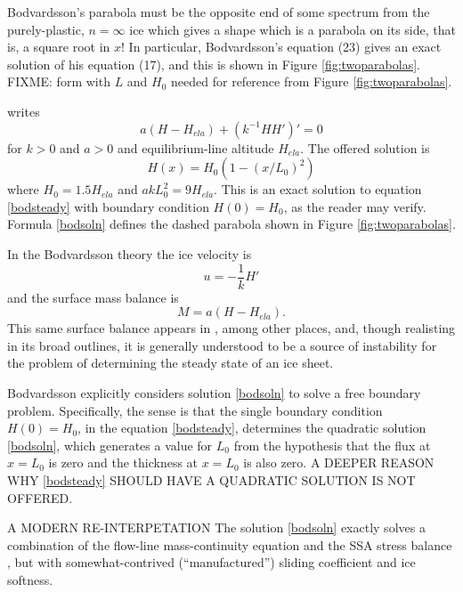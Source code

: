 \documentclass[twocolumn,letterpaper]{igs}
\begin{document}
Bodvardsson's parabola must be the opposite end of some spectrum from the
purely-plastic, $n=\infty$ ice which gives a shape which is a parabola
on its side, that is, a square root in $x$!  In particular, Bodvardsson's equation (23) gives an exact solution of his equation (17), and this is shown in Figure \ref{fig:twoparabolas}.  FIXME: form with $L$ and $H_0$ needed for reference from Figure \ref{fig:twoparabolas}.

\citet[equation (17)]{Bodvardsson} writes 
\begin{equation}
a (H - H_{ela}) + (k^{-1} H H')' = 0  \label{bodsteady}
\end{equation}
for $k>0$ and $a>0$ and equilibrium-line altitude $H_{ela}$.  The offered solution \citep[equation (23)]{Bodvardsson} is
\begin{equation}
H(x) = H_0 (1 - (x/L_0)^2)  \label{bodsoln}
\end{equation}
where $H_0 = 1.5 H_{ela}$ and $a k L_0^2 = 9 H_{ela}$.  This is an exact solution to equation \eqref{bodsteady} with boundary condition $H(0)=H_0$, as the reader may verify.  Formula \eqref{bodsoln} defines the dashed parabola shown in Figure \ref{fig:twoparabolas}.

In the Bodvardsson theory the ice velocity is
\begin{equation}
u = - \frac{1}{k} H' \label{bodstressbalance}
\end{equation}
and the surface mass balance is
\begin{equation}
M = a (H - H_{ela}).  \label{bodmassbalance}
\end{equation}
This same surface balance appears in \cite{Weertman61stability,Jouvetetal2011}, among other places, and, though realisting in its broad outlines, it is generally understood to be a source of instability for the problem of determining the steady state of an ice sheet.

Bodvardsson explicitly considers solution \eqref{bodsoln} to solve a free boundary problem.  Specifically, the sense is that the single boundary condition $H(0)=H_0$, in the equation \eqref{bodsteady}, determines the quadratic solution \eqref{bodsoln}, which generates a value for $L_0$ from the hypothesis that the flux at $x=L_0$ is zero and the thickness at $x=L_0$ is also zero.  A DEEPER REASON WHY \eqref{bodsteady} SHOULD HAVE A QUADRATIC SOLUTION IS NOT OFFERED.

A MODERN RE-INTERPETATION  The solution \eqref{bodsoln} exactly solves a combination of the flow-line mass-continuity equation and the SSA stress balance \citep{MacAyeal,WeisGreveHutter}, but with somewhat-contrived (``manufactured'') sliding coefficient and ice softness.
\end{document}
